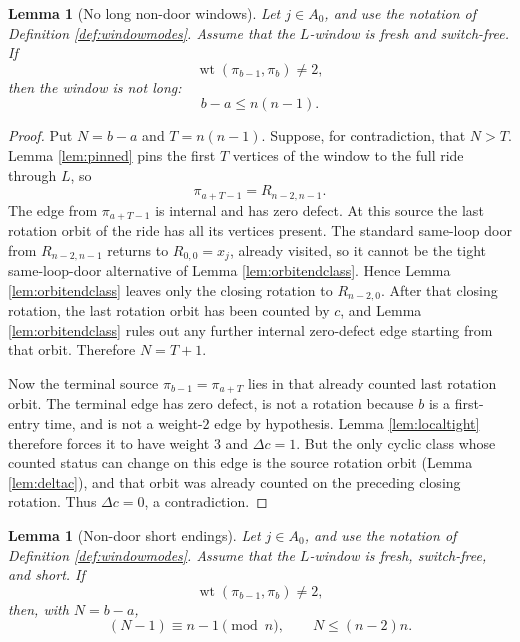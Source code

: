 \documentclass[11pt]{article}
\newtheorem{lemma}[theorem]{Lemma}
\DeclareMathOperator{\wt}{wt}
\begin{document}
\begin{lemma}[No long non-door windows]\label{lem:nolong}
Let \(j\in A_0\), and use the notation of Definition \ref{def:windowmodes}.  Assume that the
\(L\)-window is fresh and switch-free.  If
\[
  \wt(\pi_{b-1},\pi_b)\ne2,
\]
then the window is not long:
\[
  b-a\le n(n-1).
\]
\end{lemma}

\begin{proof}
Put \(N=b-a\) and \(T=n(n-1)\).  Suppose, for contradiction, that \(N>T\).  Lemma
\ref{lem:pinned} pins the first \(T\) vertices of the window to the full ride through \(L\), so
\[
  \pi_{a+T-1}=R_{n-2,n-1}.
\]
The edge from \(\pi_{a+T-1}\) is internal and has zero defect.  At this source the last rotation
orbit of the ride has all its vertices present.  The standard same-loop door from
\(R_{n-2,n-1}\) returns to \(R_{0,0}=x_j\), already visited, so it cannot be the tight
same-loop-door alternative of Lemma \ref{lem:orbitendclass}.  Hence Lemma
\ref{lem:orbitendclass} leaves only the closing rotation to \(R_{n-2,0}\).  After that closing
rotation, the last rotation orbit has been counted by \(c\), and Lemma \ref{lem:orbitendclass}
rules out any further internal zero-defect edge starting from that orbit.  Therefore \(N=T+1\).

Now the terminal source \(\pi_{b-1}=\pi_{a+T}\) lies in that already counted last rotation orbit.
The terminal edge has zero defect, is not a rotation because \(b\) is a first-entry time, and is
not a weight-\(2\) edge by hypothesis.  Lemma \ref{lem:localtight} therefore forces it to have
weight \(3\) and \(\Delta c=1\).  But the only cyclic class whose counted status can change on
this edge is the source rotation orbit (Lemma \ref{lem:deltac}), and that orbit was already
counted on the preceding
closing rotation.  Thus \(\Delta c=0\), a contradiction.
\end{proof}

\begin{lemma}[Non-door short endings]\label{lem:orbitend}
Let \(j\in A_0\), and use the notation of Definition \ref{def:windowmodes}.  Assume that the
\(L\)-window is fresh, switch-free, and short.  If
\[
  \wt(\pi_{b-1},\pi_b)\ne2,
\]
then, with \(N=b-a\),
\[
  (N-1)\equiv n-1\pmod n,\qquad N\le(n-2)n.
\]
\end{lemma}
\end{document}
